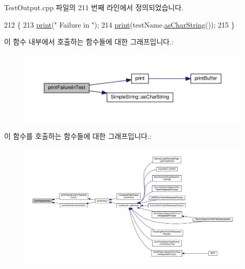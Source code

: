 Test\+Output.\+cpp 파일의 211 번째 라인에서 정의되었습니다.


\begin{DoxyCode}
212 \{
213     \hyperlink{class_test_output_a321b5c489a90374cb61c34fe5d2253ef}{print}(\textcolor{stringliteral}{" Failure in "});
214     \hyperlink{class_test_output_a321b5c489a90374cb61c34fe5d2253ef}{print}(testName.\hyperlink{class_simple_string_af7c0efaf31f42553f05719903c830be1}{asCharString}());
215 \}
\end{DoxyCode}


이 함수 내부에서 호출하는 함수들에 대한 그래프입니다.\+:
\nopagebreak
\begin{figure}[H]
\begin{center}
\leavevmode
\includegraphics[width=350pt]{class_test_output_a1748d410d65b95596df95234742258a3_cgraph}
\end{center}
\end{figure}




이 함수를 호출하는 함수들에 대한 그래프입니다.\+:
\nopagebreak
\begin{figure}[H]
\begin{center}
\leavevmode
\includegraphics[width=350pt]{class_test_output_a1748d410d65b95596df95234742258a3_icgraph}
\end{center}
\end{figure}


